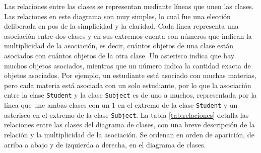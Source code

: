 Las relaciones entre las clases se representan mediante líneas que unen las clases. Las relaciones en este diagrama son muy simples, lo cual fue una elección deliberada en pos de la simplicidad y la claridad. Cada línea representa una asociación entre dos clases y en sus extremos cuenta con números que indican la multiplicidad de la asociación, es decir, cuántos objetos de una clase están asociados con cuántos objetos de la otra clase. Un asterisco indica que hay muchos objetos asociados, mientras que un número indica la cantidad exacta de objetos asociados. Por ejemplo, un estudiante está asociado con muchas materias, pero cada materia está asociada con un solo estudiante, por lo que la asociación entre la clase \texttt{Student} y la clase \texttt{Subject} es de uno a muchos, representada por la línea que une ambas clases con un 1 en el extremo de la clase \texttt{Student} y un asterisco en el extremo de la clase \texttt{Subject}. La tabla \ref{tab:relaciones} detalla las relaciones entre las clases del diagrama de clases, con una breve descripción de la relación y la multiplicidad de la asociación. Se ordenan en orden de aparición, de arriba a abajo y de izquierda a derecha, en el diagrama de clases.


